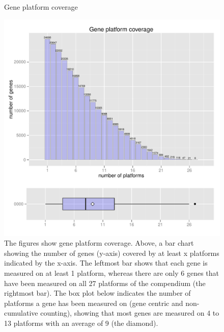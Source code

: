 \begin{figure}[t]
	\centering
	\caption{Gene platform coverage}\label{fig:maize-accu-platform-count}
	\includegraphics[trim=0cm 0cm 0cm 1.2cm, clip=true, 
		width=1\textwidth]{ApdxB-accu_platform_count.pdf}
	\caption*{The figures show gene platform coverage. Above, a bar chart 
	showing the number of genes (y-axis) covered by  at least x platforms 
	indicated by the x-axis. 
	The leftmost bar shows that each gene is measured on at least 1 
	platform, whereas there are only 6 genes that have been measured on all 27 
	platforms of the compendium (the rightmost bar). 
	The box plot below indicates the number of platforms a gene has been 
	measured on (gene centric and non-cumulative counting), showing that most 
	genes are measured on 4 to 13 platforms with an average of 9 (the diamond).}
\end{figure}


